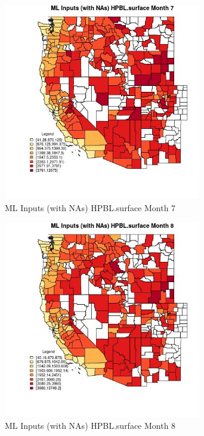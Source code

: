 \begin{figure} 
\centering  
\includegraphics[width=0.77\textwidth]{Code_Outputs/Report_ML_input_PM25_Step4_part_e_de_duplicated_aves_compiled_2019-05-21wNAs_CountyHPBLsurfacemedianMonth7.jpg} 
\caption{\label{fig:Report_ML_input_PM25_Step4_part_e_de_duplicated_aves_compiled_2019-05-21wNAsCountyHPBLsurfacemedianMonth7}ML Inputs (with NAs) HPBL.surface Month 7} 
\end{figure} 
 

\begin{figure} 
\centering  
\includegraphics[width=0.77\textwidth]{Code_Outputs/Report_ML_input_PM25_Step4_part_e_de_duplicated_aves_compiled_2019-05-21wNAs_CountyHPBLsurfacemedianMonth8.jpg} 
\caption{\label{fig:Report_ML_input_PM25_Step4_part_e_de_duplicated_aves_compiled_2019-05-21wNAsCountyHPBLsurfacemedianMonth8}ML Inputs (with NAs) HPBL.surface Month 8} 
\end{figure} 
 

